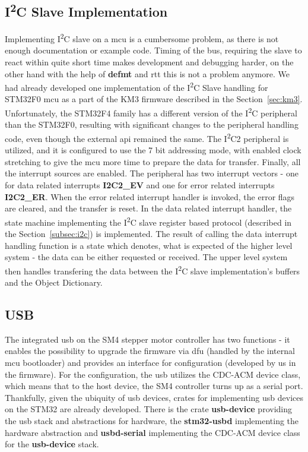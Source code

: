\subsection{I\textsuperscript{2}C Slave Implementation}
\label{subsec:i2c_impl}
Implementing I\textsuperscript{2}C slave on a \acs{mcu} is a cumbersome problem, as there is not enough documentation or example code.
Timing of the bus, requiring the slave to react within quite short time makes development and debugging harder, on the other hand with the help of \textbf{defmt} and \acs{rtt} this is not a problem anymore.
We had already developed one implementation of the I\textsuperscript{2}C Slave handling for STM32F0 \acs{mcu} as a part of the KM3 firmware described in the Section~\ref{sec:km3}.
Unfortunately, the STM32F4 family has a different version of the I\textsuperscript{2}C peripheral than the STM32F0, resulting with significant changes to the peripheral handling code, even though the external \acs{api} remained the same.
The I\textsuperscript{2}C2 peripheral is utilized, and it is configured to use the 7 bit addressing mode, with enabled clock stretching to give the \acs{mcu} more time to prepare the data for transfer.
Finally, all the interrupt sources are enabled.
The peripheral has two interrupt vectors - one for data related interrupts \textbf{I2C2\_EV} and one for error related interrupts \textbf{I2C2\_ER}.
When the error related interrupt handler is invoked, the error flags are cleared, and the transfer is reset.
In the data related interrupt handler, the state machine implementing the I\textsuperscript{2}C slave register based protocol (described in the Section~\ref{subsec:i2c}) is implemented.
The result of calling the data interrupt handling function is a state which denotes, what is expected of the higher level system - the data can be either requested or received.
The upper level system then handles transfering the data between the I\textsuperscript{2}C slave implementation's buffers and the Object Dictionary.


\subsection{USB}
\label{subsec:usb_impl}
The integrated \acs{usb} on the SM4 stepper motor controller has two functions - it enables the possibility to upgrade the firmware via \acs{dfu} (handled by the internal \acs{mcu} bootloader) and provides an interface for configuration (developed by us in the firmware).
For the configuration, the \acs{usb} utilizes the CDC-ACM device class, which means that to the host device, the SM4 controller turns up as a serial port.
Thankfully, given the ubiquity of \acs{usb} devices, crates for implementing \acs{usb} devices on the STM32 are already developed.
There is the crate \textbf{usb-device} providing the \acs{usb} stack and abstractions for hardware\cite{virkkunen_mvirkkunenusb-device_2021}, the \textbf{stm32-usbd}\cite{noauthor_stm32-rsstm32-usbd_2021} implementing the hardware abstraction and \textbf{usbd-serial}\cite{virkkunen_mvirkkunenusbd-serial_2021} implementing the CDC-ACM device class for the \textbf{usb-device} stack.

